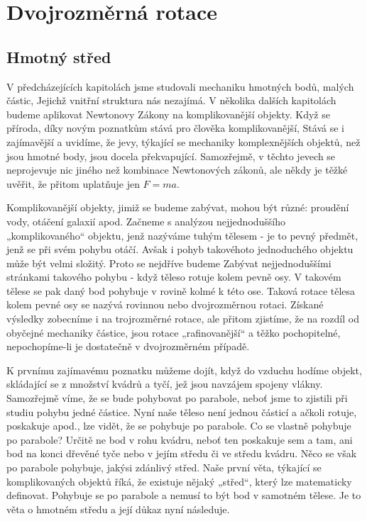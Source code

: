 \setchaptertoc
\chapter{Dvojrozměrná rotace}\label{fyz:IchapXVIII}
  \section{Hmotný střed}\label{fyz:IchapXVIIIsecI}
    V předcházejících kapitolách jsme studovali mechaniku hmotných bodů, malých částic, Jejichž
    vnitřní struktura nás nezajímá. V několika dalších kapitolách budeme aplikovat Newtonovy Zákony
    na komplikovanější objekty. Když se příroda, díky novým poznatkům stává pro člověka
    komplikovanější, Stává se i zajímavější a uvidíme, že jevy, týkající se mechaniky komplexnějších
    objektů, než jsou hmotné body, jsou docela překvapující. Samozřejmě, v těchto jevech se
    neprojevuje nic jiného než kombinace Newtonových zákonů, ale někdy je těžké uvěřit, že přitom
    uplatňuje jen \(F= ma\).
    
    Komplikovanější objekty, jimiž se budeme zabývat, mohou být různé: proudění vody, otáčení
    galaxií apod. Začneme s analýzou nejjednoduššího „komplikovaného“ objektu, jenž nazýváme tuhým
    tělesem - je to pevný předmět, jenž se při svém pohybu otáčí. Avšak i pohyb takovéhoto
    jednoduchého objektu může být velmi složitý. Proto se nejdříve budeme Zabývat nejjednoduššími
    stránkami takového pohybu - když těleso rotuje kolem pevně osy. V takovém tělese se pak daný bod
    pohybuje v rovině kolmé k této ose. Taková rotace tělesa kolem pevné osy se nazývá rovinnou nebo
    dvojrozměrnou rotaci. Získané výsledky zobecníme i na trojrozměrné rotace, ale přitom zjistíme,
    že na rozdíl od obyčejné mechaniky částice, jsou rotace „raﬁnovanější“ a těžko pochopitelné,
    nepochopíme-li je dostatečně v dvojrozměrném případě.

    K prvnímu zajímavému poznatku můžeme dojít, když do vzduchu hodíme objekt, skládající se z
    množství kvádrů a tyčí, jež jsou navzájem spojeny vlákny. Samozřejmě víme, že se bude pohybovat
    po parabole, neboť jsme to zjistili při studiu pohybu jedné částice. Nyní naše těleso není
    jednou částicí a ačkoli rotuje, poskakuje apod., lze vidět, že se pohybuje po parabole. Co se
    vlastně pohybuje po parabole? Určitě ne bod v rohu kvádru, neboť ten poskakuje sem a tam, ani
    bod na konci dřevěné tyče nebo v jejím středu či ve středu kvádru. Něco se však po parabole
    pohybuje, jakýsi zdánlivý střed. Naše první věta, týkající se komplikovaných objektů říká, že
    existuje nějaký „střed“, který lze matematicky deﬁnovat. Pohybuje se po parabole a nemusí to být
    bod v samotném tělese. Je to věta o hmotném středu a její důkaz nyní následuje.

